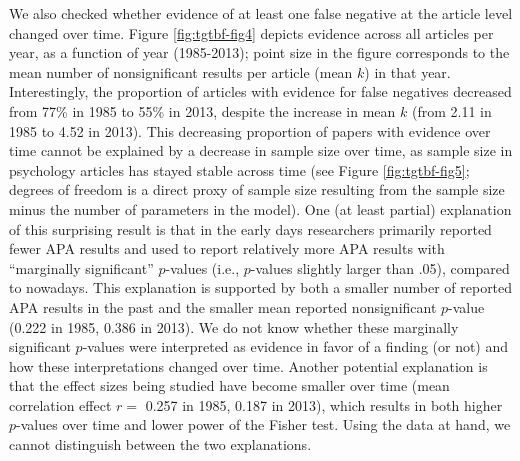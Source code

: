\documentclass[a5paper]{book}
\begin{document}
We also checked whether evidence of at least one false negative at the
article level changed over time. Figure \ref{fig:tgtbf-fig4} depicts
evidence across all articles per year, as a function of year
(1985-2013); point size in the figure corresponds to the mean number of
nonsignificant results per article (mean \(k\)) in that year.
Interestingly, the proportion of articles with evidence for false
negatives decreased from 77\% in 1985 to 55\% in 2013, despite the
increase in mean \(k\) (from 2.11 in 1985 to 4.52 in 2013). This
decreasing proportion of papers with evidence over time cannot be
explained by a decrease in sample size over time, as sample size in
psychology articles has stayed stable across time (see Figure
\ref{fig:tgtbf-fig5}; degrees of freedom is a direct proxy of sample
size resulting from the sample size minus the number of parameters in
the model). One (at least partial) explanation of this surprising result
is that in the early days researchers primarily reported fewer APA
results and used to report relatively more APA results with
\enquote{marginally significant} \(p\)-values (i.e., \(p\)-values
slightly larger than .05), compared to nowadays. This explanation is
supported by both a smaller number of reported APA results in the past
and the smaller mean reported nonsignificant \(p\)-value (0.222 in 1985,
0.386 in 2013). We do not know whether these marginally significant
\(p\)-values were interpreted as evidence in favor of a finding (or not)
and how these interpretations changed over time. Another potential
explanation is that the effect sizes being studied have become smaller
over time (mean correlation effect \(r=\) 0.257 in 1985, 0.187 in 2013),
which results in both higher \(p\)-values over time and lower power of
the Fisher test. Using the data at hand, we cannot distinguish between
the two explanations.
\end{document}

